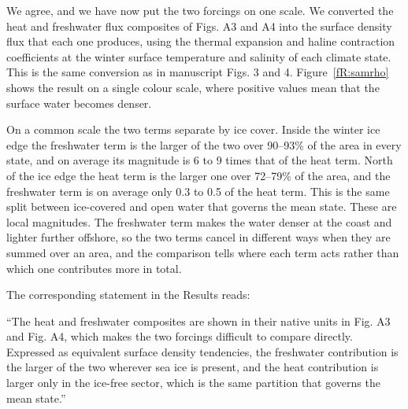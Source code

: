 \response We agree, and we have now put the two forcings on one scale. We converted the heat and freshwater flux composites of Figs. A3 and A4 into the surface density flux that each one produces, using the thermal expansion and haline contraction coefficients at the winter surface temperature and salinity of each climate state. This is the same conversion as in manuscript Figs. 3 and 4. Figure~\ref{fR:samrho} shows the result on a single colour scale, where positive values mean that the surface water becomes denser.


On a common scale the two terms separate by ice cover. Inside the winter ice edge the freshwater term is the larger of the two over 90–93\% of the area in every state, and on average its magnitude is 6 to 9 times that of the heat term. North of the ice edge the heat term is the larger one over 72–79\% of the area, and the freshwater term is on average only 0.3 to 0.5 of the heat term. This is the same split between ice-covered and open water that governs the mean state. These are local magnitudes. The freshwater term makes the water denser at the coast and lighter further offshore, so the two terms cancel in different ways when they are summed over an area, and the comparison tells where each term acts rather than which one contributes more in total.

The corresponding statement in the Results reads:

\begin{change}
``The heat and freshwater composites are shown in their native units in Fig. A3 and Fig. A4, which makes the two forcings difficult to compare directly. Expressed as equivalent surface density tendencies, the freshwater contribution is the larger of the two wherever sea ice is present, and the heat contribution is larger only in the ice-free sector, which is the same partition that governs the mean state.''
\end{change}

